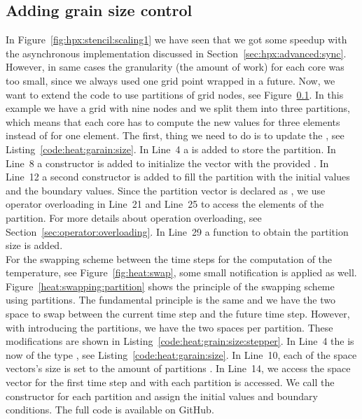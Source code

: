\subsection{Adding grain size control}
In Figure~\ref{fig:hpx:stencil:scaling1} we have seen that we got some speedup with the asynchronous implementation discussed in Section~\ref{sec:hpx:advanced:sync}. However, in same cases the granularity (the amount of work) for each core was too small, since we always used one grid point wrapped in a future. Now, we want to extend the code to use partitions of grid nodes, see Figure~\ref{}. In this example we have a grid with nine nodes and we split them into three partitions, which means that each core has to compute the new values for three elements instead of for one element. The first, thing we need to do is to update the , see Listing~\ref{code:heat:garain:size}. In Line~4 a  is added to store the partition. In Line~8 a constructor is added to initialize the vector  with the provided . In Line~12 a second constructor is added to fill the partition with the initial values and the boundary values. Since the partition vector is declared as , we use operator overloading in Line~21 and Line~25 to access the elements of the partition. For more details about operation overloading, see Section~\ref{sec:operator:overloading}. In Line~29 a function to obtain the partition size is added. \\

For the swapping scheme between the time steps for the computation of the temperature, see Figure~\ref{fig:heat:swap}, some small notification is applied as well. Figure~\ref{heat:swapping:partition} shows the principle of the swapping scheme using partitions. The fundamental principle is the same and we have the two space  to swap between the current time step and the future time step. However, with introducing the partitions, we have the two spaces per partition. These modifications are shown in Listing~\ref{code:heat:grain:size:stepper}. In Line~4 the  is now of the type , see Listing~\ref{code:heat:garain:size}. In Line~10, each of the space vectors's size is set to the amount of partitions . In Line~14, we access the space vector  for the first time step and with  each partition is accessed. We call the constructor for each partition and assign the initial values and boundary conditions. The full code is available on GitHub.


